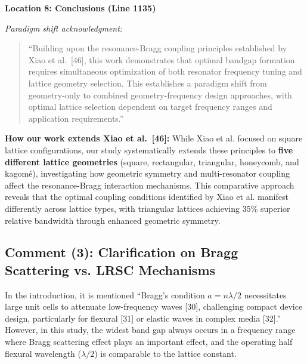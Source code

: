 \documentclass[11pt,a4paper]{article}
\newenvironment{reviewerbox}{%
    \par\medskip\noindent{\color{reviewercolor}\rule{\linewidth}{2pt}}\par
    \noindent{\color{reviewercolor}\bfseries Reviewer Comment}\par\smallskip
}{%
    \par\noindent{\color{reviewercolor}\rule{\linewidth}{0.5pt}}\medskip
}
\newenvironment{changesbox}{%
    \par\medskip\noindent{\color{changescolor}\rule{\linewidth}{2pt}}\par
    \noindent{\color{changescolor}\bfseries Manuscript Changes}\par\smallskip
}{%
    \par\noindent{\color{changescolor}\rule{\linewidth}{0.5pt}}\medskip
}
\begin{document}
\begin{changesbox}
\textbf{Location 8: Conclusions (Line 1135)}

\textit{Paradigm shift acknowledgment:}
\begin{quote}
\textcolor{redtext}{``Building upon the resonance-Bragg coupling principles established by Xiao et al.~[46], this work demonstrates that optimal bandgap formation requires simultaneous optimization of both resonator frequency tuning and lattice geometry selection. This establishes a paradigm shift from geometry-only to combined geometry-frequency design approaches, with optimal lattice selection dependent on target frequency ranges and application requirements.''}
\end{quote}
\end{changesbox}

\textbf{How our work extends Xiao et al.~[46]:} While Xiao et al. focused on square lattice configurations, our study systematically extends these principles to \textbf{five different lattice geometries} (square, rectangular, triangular, honeycomb, and kagom\'{e}), investigating how geometric symmetry and multi-resonator coupling affect the resonance-Bragg interaction mechanisms. This comparative approach reveals that the optimal coupling conditions identified by Xiao et al. manifest differently across lattice types, with triangular lattices achieving 35\% superior relative bandwidth through enhanced geometric symmetry.

\newpage

\subsection*{Comment (3): Clarification on Bragg Scattering vs. LRSC Mechanisms}

\begin{reviewerbox}
In the introduction, it is mentioned ``Bragg's condition $a = n\lambda/2$ necessitates large unit cells to attenuate low-frequency waves [30], challenging compact device design, particularly for flexural [31] or elastic waves in complex media [32].'' However, in this study, the widest band gap always occurs in a frequency range where Bragg scattering effect plays an important effect, and the operating half flexural wavelength ($\lambda/2$) is comparable to the lattice constant.
\end{reviewerbox}
\end{document}
